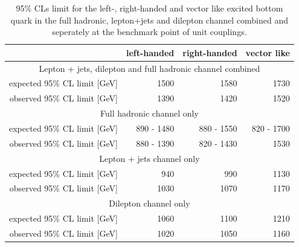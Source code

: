 \begin{table}[hp]
\centering
\begin{tabular}{r|rrr}
\hline
&left-handed&right-handed&vector like\\
\hline\hline
\multicolumn{4}{c}{Lepton + jets, dilepton and full hadronic channel combined} \\
\hline
expected 95\% CL limit [GeV] &  1500 & 1580 & 1730 \\
observed 95\% CL limit [GeV] &  1390 & 1420 & 1520 \\
\hline
\multicolumn{4}{c}{Full hadronic channel only} \\
\hline
expected 95\% CL limit [GeV] & 890 - 1480 & 880 - 1550 & 820 - 1700 \\
observed 95\% CL limit [GeV] & 880 - 1390 & 820 - 1430 & 1530 \\
\hline
\multicolumn{4}{c}{Lepton + jets channel only} \\
\hline
expected 95\% CL limit [GeV] & 940  & 990  & 1130 \\
observed 95\% CL limit [GeV] & 1030 & 1070 & 1170 \\
\hline
\multicolumn{4}{c}{Dilepton channel only} \\
\hline
expected 95\% CL limit [GeV] & 1060 & 1100 & 1210 \\
observed 95\% CL limit [GeV] & 1020 & 1050 & 1160 \\
\hline
\end{tabular}
\caption{95\% CLs limit for the left-, right-handed and vector like excited bottom quark in the full hadronic, lepton+jets and dilepton channel combined and seperately at the benchmark point of unit couplings.}
\label{limitTable}
\end{table}


